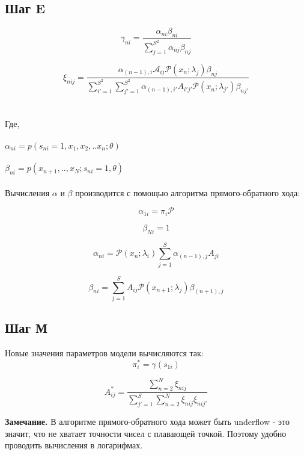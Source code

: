 \documentclass{matmex-diploma-custom}
\begin{document}
\subsection*{Шаг E}
\begin{equation}\gamma_{ni}=\frac{\alpha_{ni}\beta_{ni}}{\sum_{j=1}^{S^2}\alpha_{nj}\beta_{nj}}\end{equation}

\begin{equation}\xi_{nij}=\frac{\alpha_{(n-1),i}\mathcal{A}_{ij}\mathcal{P}(x_n;\lambda_j)\beta_{nj}}{\sum_{i'=1}^{S^2}\sum_{j'=1}^{S^2}\alpha_{(n-1),i'}A_{i'j'}\mathcal{P}(x_n;\lambda_{j'})\beta_{nj'}}\end{equation}
\\\\
Где, 
\\\\
$\alpha_{ni}=p(s_{ni}=1,x_1,x_2,..x_n;\theta)$
\\\\
$\beta_{ni}=p(x_{n+1}, ..,x_N; s_{ni}=1,\theta)$
\\\\
Вычисления $\alpha$ и $\beta$ производится с помощью алгоритма прямого-обратного хода\cite{article:rabiner}:

$$\alpha_{1i}=\pi_i\mathcal{P}$$

$$\beta_{Ni}=1$$

$$\alpha_{ni}=\mathcal{P}(x_n;\lambda_i)\sum_{j=1}^S\alpha_{(n-1),j}A_{ji}$$

$$\beta_{ni}=\sum_{j=1}^S A_{ij}\mathcal{P}(x_{n+1};\lambda_j)\beta_{(n+1),j}$$

\subsection*{Шаг М}
Новые значения параметров модели вычисляются так:
\begin{equation}\pi_i^*=\gamma(s_{1i})\end{equation}

\begin{equation}A_{ij}^*=\frac{\sum_{n=2}^N\xi_{nij}}{\sum_{j'=1}^S\sum_{n=2}^N\xi_{nij}\xi_{nij'}}\end{equation}


\textbf{Замечание.} В алгоритме прямого-обратного хода может быть underflow - это значит, что не хватает точности чисел с плавающей точкой.
Поэтому удобно проводить вычисления в логарифмах\cite{wiki:logsumexp}.
\end{document}
